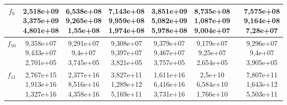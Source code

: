 \begin{table}[t]
\begin{small}
\begin{tabular}{|c|c|c|c|c|c|c|c|}
        $f_9$    & \makecell{2,518e+09 \\ 3,375e+09 \\ 4,801e+08} & \makecell{6,538e+08 \\ 9,265e+08 \\ 1,55e+08}  & \makecell{7,143e+08 \\ 9,959e+08 \\ 1,974e+08} & \makecell{3,851e+09 \\ 5,082e+09 \\ 5,978e+08} & \makecell{8,735e+08 \\ 1,087e+09 \\ 9,004e+07} & & \makecell{7,575e+08 \\ 9,164e+08 \\ 7,28e+07} \\\hline
        $f_{10}$ & \makecell{9,358e+07 \\ 9,433e+07 \\ 2,701e+05} & \makecell{9,291e+07 \\ 9,4e+07 \\ 3,745e+05}   & \makecell{9,308e+07 \\ 9,397e+07 \\ 3,821e+05} & \makecell{9,379e+07 \\ 9,467e+07 \\ 3,757e+05} & \makecell{9,179e+07 \\ 9,25e+07 \\ 2,654e+05}  & & \makecell{9,296e+07 \\ 9,4e+07 \\ 3,905e+05}   \\\hline
        $f_{11}$ & \makecell{2,767e+15 \\ 1,913e+16 \\ 1,327e+16} & \makecell{2,377e+16 \\ 8,516e+16 \\ 4,358e+16} & \makecell{3,827e+11 \\ 1,289e+12 \\ 5,169e+11} & \makecell{1,611e+16 \\ 6,416e+16 \\ 3,731e+16} & \makecell{2,5e+10 \\ 6,584e+10 \\ 1,766e+10}   & & \makecell{7,807e+11 \\ 1,643e+12 \\ 5,503e+11} \\\hline

\end{tabular}
\end{small}
\end{table}
